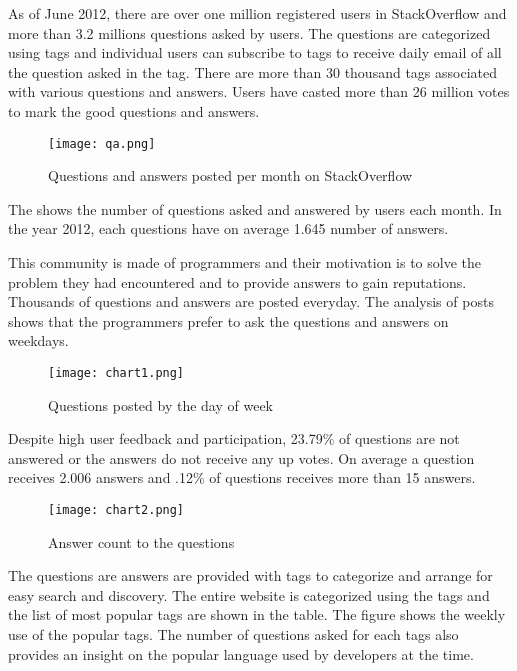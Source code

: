 As of June 2012, there are over one million registered users in StackOverflow and more than 3.2 millions questions asked by users. The questions are categorized using tags and individual users can subscribe to tags to receive daily email of all the question asked in the tag. There are more than 30 thousand tags associated with various questions and answers. Users have casted more than 26 million votes to mark the good questions and answers.

\begin{figure}[!htb]
  \centering
  \texttt{[image: qa.png]}
  \caption{Questions and answers posted per month on StackOverflow}
  \label{Figure:figex4a}
\end{figure}

The  shows the number of questions asked and answered by users each month. In the year 2012, each questions have on average 1.645 number of answers.

This community is made of programmers and their motivation is to solve the problem they had encountered and to provide answers to gain reputations. Thousands of questions and answers are posted everyday. The analysis of posts shows that the programmers prefer to ask the questions and answers on weekdays.

\begin{figure}[!htb]
  \centering
  \texttt{[image: chart1.png]}
  \caption{Questions posted by the day of week}
  \label{Figure:figex4b}
\end{figure}

Despite high user feedback and participation, 23.79\% of questions are not answered or the answers do not receive any up votes. On average a question receives 2.006 answers and .12\% of questions receives more than 15 answers.

\begin{figure}[!htb]
  \centering
  \texttt{[image: chart2.png]}
  \caption{Answer count to the questions}
  \label{Figure:figex4c}
\end{figure}

The questions are answers are provided with tags to categorize and arrange for easy search and discovery. The entire website is categorized using the tags and the list of most popular tags are shown in the table. The figure shows the weekly use of the popular tags. The number of questions asked for each tags also provides an insight on the popular language used by developers at the time.

